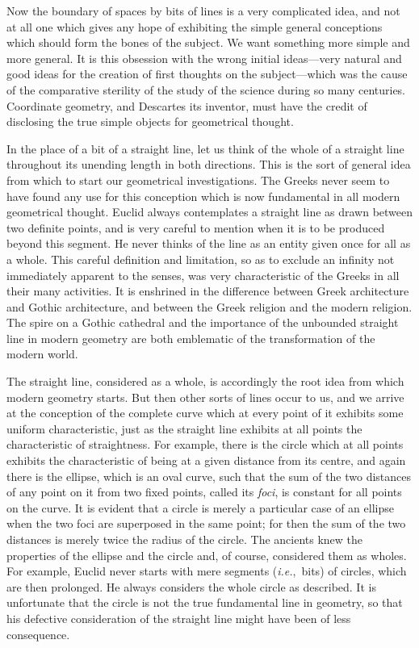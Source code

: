 \documentclass[12pt,leqno]{book}[2005/09/16]
\newcommand{\PageSep}[1]{\ignorespaces}
\newcommand{\ie}{\emph{i.e.}}
\begin{document}
Now the boundary of spaces by bits of
lines is a very complicated idea, and not at
all one which gives any hope of exhibiting
the simple general conceptions which should
form the bones of the subject. We want
something more simple and more general. It
is this obsession with the wrong initial ideas---very
natural and good ideas for the creation
\PageSep{119}
of first thoughts on the subject---which was
the cause of the comparative sterility of the
study of the science during so many centuries.
Coordinate geometry, and Descartes its inventor,
must have the credit of disclosing the
true simple objects for geometrical thought.

In the place of a bit of a straight line, let
us think of the whole of a straight line
throughout its unending length in both directions.
This is the sort of general idea from
which to start our geometrical investigations.
The Greeks never seem to have found any
use for this conception which is now fundamental
in all modern geometrical thought.
Euclid always contemplates a straight line as
drawn between two definite points, and is
very careful to mention when it is to be produced
beyond this segment. He never thinks
of the line as an entity given once for all as a
whole. This careful definition and limitation,
so as to exclude an infinity not immediately
apparent to the senses, was very characteristic
of the Greeks in all their many
activities. It is enshrined in the difference
between Greek architecture and Gothic architecture,
and between the Greek religion and
the modern religion. The spire on a Gothic
cathedral and the importance of the unbounded
straight line in modern geometry
are both emblematic of the transformation of
the modern world.
\PageSep{120}

The straight line, considered as a whole,
is accordingly the root idea from which
modern geometry starts. But then other
sorts of lines occur to us, and we arrive at the
conception of the complete curve which at
every point of it exhibits some uniform characteristic,
just as the straight line exhibits
at all points the characteristic of straightness.
For example, there is the circle which
%
at all points exhibits the characteristic of
being at a given distance from its centre, and
again there is the ellipse, which is an oval
%
curve, such that the sum of the two distances
of any point on it from two fixed points, called
%
its \emph{foci}, is constant for all points on the curve.
It is evident that a circle is merely a particular
case of an ellipse when the two foci are
superposed in the same point; for then the
sum of the two distances is merely twice the
radius of the circle. The ancients knew the
properties of the ellipse and the circle and, of
course, considered them as wholes. For example,
Euclid never starts with mere segments
(\ie,~bits) of circles, which are then prolonged.
He always considers the whole circle
as described. It is unfortunate that the
circle is not the true fundamental line in
geometry, so that his defective consideration
of the straight line might have been of less
consequence.
\end{document}
